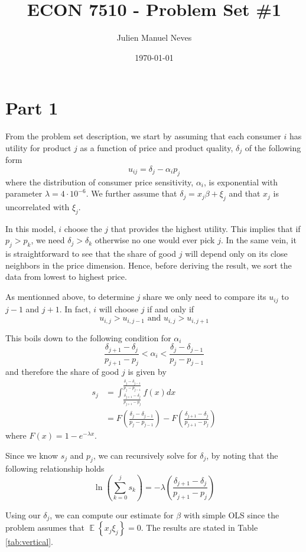 \documentclass[12pt]{article}
\title{ECON 7510 - Problem Set \#1}
\date{\today}
\author{Julien Manuel Neves}
\newcommand{\1}{{\bf 1}} %
\DeclareMathOperator{\E}{\mathbb{E}} %
\newcommand{\Ex}[1]{\E\left\{#1\right\}} %
\begin{document}
\maketitle

\section*{Part 1}

From the problem set description, we start by assuming that each consumer $i$
has utility for product $j$ as a function of price and product quality, $\delta_j$ of the following form
\[
u_{ij} =\delta_j -\alpha_i p_j
\]
where the distribution of consumer price sensitivity, $\alpha_i$, is exponential with parameter $\lambda = 4\cdot 10^{-6}$. We further assume that $\delta_j = x_j\beta +\xi_j$ and that $x_j$ is uncorrelated with $\xi_j$.

In this model, $i$ choose the $j$ that provides the highest utility. This implies that if $p_j>p_k$, we need $\delta_j>\delta_k$ otherwise no one would ever pick $j$. In the same vein, it is straightforward to see that the share of good $j$ will depend only on its close neighbors in the price dimension. Hence, before deriving the result, we sort the data from lowest to highest price.

As mentionned above, to determine $j$ share we only need to compare its $u_{ij}$ to $j-1$ and $j+1$. In fact, $i$ will choose $j$ if and only if
\[
u_{i,j}>u_{i,j-1} \text{ and } u_{i,j}>u_{i,j+1}
\]

This boils down to the following condition for $\alpha_i$
\[
\frac{\delta_{j+1}-\delta_{j}}{p_{j+1}-p_{j}}<\alpha_i<\frac{\delta_j-\delta_{j-1}}{p_j-p_{j-1}}
\]
and therefore the share of good $j$ is given by
\begin{align*}
	s_j&=\int_{\frac{\delta_{j+1}-\delta_{j}}{p_{j+1}-p_{j}}}^{\frac{\delta_j-\delta_{j-1}}{p_j-p_{j-1}}}f(x)dx\\
	& = F\left({\frac{\delta_j-\delta_{j-1}}{p_j-p_{j-1}}}\right) - F\left( {\frac{\delta_{j+1}-\delta_{j}}{p_{j+1}-p_{j}}}\right)
\end{align*}
where $F(x)= 1-e^{-\lambda x}$.

Since we know $s_j$ and $p_j$, we can recursively solve for $\delta_j$, by noting that the following relationship holds
\[
\ln\left(\sum_{k=0}^j s_k\right) = -\lambda \left({\frac{\delta_{j+1}-\delta_{j}}{p_{j+1}-p_{j}}}\right)
\]

Using our $\delta_j$, we can compute our estimate for $\beta$ with simple OLS since the problem assumes that $\Ex{x_j\xi_j}=0$. The results are stated in Table \ref{tab:vertical}.
\end{document}
